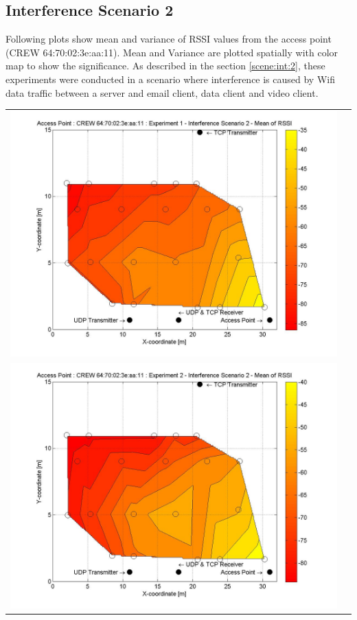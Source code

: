 \documentclass[11pt,a4paper,headinclude,footinclude,chapterprefix=on]{scrreprt}
\begin{document}
\subsection{Interference Scenario 2} 
Following plots show mean and variance of RSSI values from the access point (CREW 64:70:02:3e:aa:11). Mean and Variance are plotted spatially with color map to show the significance. As described in the section \ref{scene:int:2}, these experiments were conducted in a scenario where interference is caused by Wifi data traffic between a server and email client, data client and video client.
\begin{longtable}
	{lr} 
	\includegraphics[width=13cm]{../../Source/plot/CREW_11/11_Wifi_Ex_1_Mean.jpg} \\
	\includegraphics[width=13cm]{../../Source/plot/CREW_11/11_Wifi_Ex_2_Mean.jpg} \\

\end{longtable}
\end{document}
